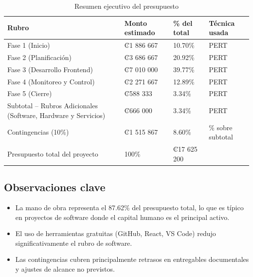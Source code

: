\documentclass[11pt,spanish]{article}
\begin{document}
\begin{table}[H]
\centering
\caption{Resumen ejecutivo del presupuesto}
\label{tab:resumen-presupuesto}
\begin{tabularx}{\textwidth}{Y P{3.2cm} P{2.8cm} P{3cm}}
\toprule
\textbf{Rubro} & \textbf{Monto estimado} & \textbf{\% del total} & \textbf{Técnica usada} \\
\midrule
Fase 1 (Inicio) & ₡1 886 667 & 10.70\% & PERT \\
Fase 2 (Planificación) & ₡3 686 667 & 20.92\% & PERT \\
Fase 3 (Desarrollo Frontend) & ₡7 010 000 & 39.77\% & PERT \\
Fase 4 (Monitoreo y Control) & ₡2 271 667 & 12.89\% & PERT \\
Fase 5 (Cierre) & ₡588 333 & 3.34\% & PERT \\
Subtotal – Rubros Adicionales (Software, Hardware y Servicios) & ₡666 000 & 3.34\% & PERT \\
Contingencias (10\%) & ₡1 515 867 & 8.60\% & \% sobre subtotal \\
Presupuesto total del proyecto & 100\% & ₡17 625 200 \\
\bottomrule
\end{tabularx}
\end{table}

\subsection{Observaciones clave}

\begin{itemize}
    \item La mano de obra representa el 87.62\% del presupuesto total, lo que es típico en proyectos de software donde el capital humano es el principal activo.
    \item El uso de herramientas gratuitas (GitHub, React, VS Code) redujo significativamente el rubro de software.
    \item Las contingencias cubren principalmente retrasos en entregables documentales y ajustes de alcance no previstos.
\end{itemize}
\end{document}

